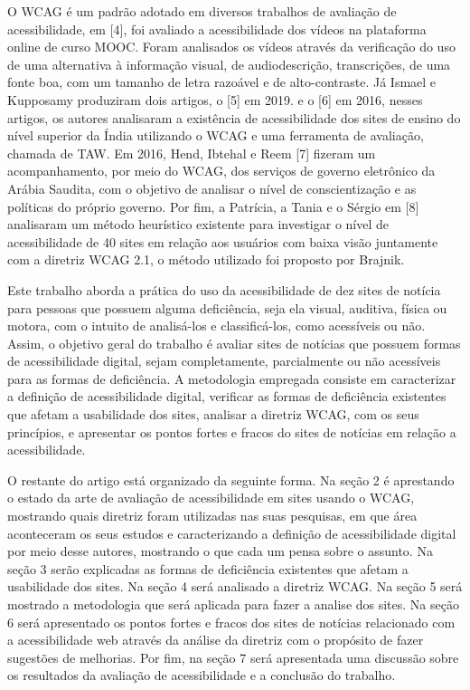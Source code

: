 \documentclass[a4paper]{article}
\begin{document}
\begin{titlepage}
O WCAG é um padrão adotado em diversos trabalhos de avaliação de acessibilidade, em [4], foi avaliado a acessibilidade dos vídeos na plataforma online de curso MOOC. Foram analisados os vídeos através da verificação do uso de uma alternativa à informação visual, de audiodescrição, transcrições, de uma fonte boa, com um tamanho de letra razoável e de alto-contraste. Já Ismael e Kupposamy produziram dois artigos, o [5] em 2019. e o [6] em 2016, nesses artigos, os autores analisaram a existência de acessibilidade dos sites de ensino do nível superior da Índia utilizando o WCAG e uma ferramenta de avaliação, chamada de TAW. Em 2016, Hend, Ibtehal e Reem [7] fizeram um acompanhamento, por meio do WCAG, dos serviços de governo eletrônico da Arábia Saudita, com o objetivo de analisar o nível de conscientização e as políticas do próprio governo. Por fim, a Patrícia, a Tania e o Sérgio em [8] analisaram um método heurístico existente para investigar o nível de acessibilidade de 40 sites em relação aos usuários com baixa visão juntamente com a diretriz WCAG 2.1, o método utilizado foi proposto por Brajnik.

Este trabalho aborda a prática do uso da acessibilidade de dez sites de notícia para pessoas que possuem alguma deficiência, seja ela visual, auditiva, física ou motora, com o intuito de analisá-los e classificá-los, como acessíveis ou não. Assim, o objetivo geral do trabalho é avaliar sites de notícias que possuem formas de acessibilidade digital, sejam completamente, parcialmente ou não acessíveis para as formas de deficiência.  A metodologia empregada consiste em caracterizar a definição de acessibilidade digital, verificar as formas de deficiência existentes que afetam a usabilidade dos sites, analisar a diretriz WCAG, com os seus princípios, e apresentar os pontos fortes e fracos do sites de notícias em relação a acessibilidade.

O restante do artigo está organizado da seguinte forma. Na seção 2 é aprestando o estado da arte de avaliação de acessibilidade em sites usando o WCAG, mostrando quais diretriz foram utilizadas nas suas pesquisas, em que área aconteceram os seus estudos e caracterizando a definição de acessibilidade digital por meio desse autores, mostrando o que cada um pensa sobre o assunto. Na seção 3 serão explicadas as formas de deficiência existentes que afetam a usabilidade dos sites. Na seção 4 será analisado a diretriz WCAG. Na seção 5 será mostrado a metodologia que será aplicada para fazer a analise dos sites. Na seção 6 será apresentado os pontos fortes e fracos dos sites de notícias relacionado com a acessibilidade web através da análise da diretriz com o propósito de fazer sugestões de melhorias. Por fim, na seção 7 será apresentada uma discussão sobre os resultados da avaliação de acessibilidade e a conclusão do trabalho.


\end{titlepage}
\end{document}
